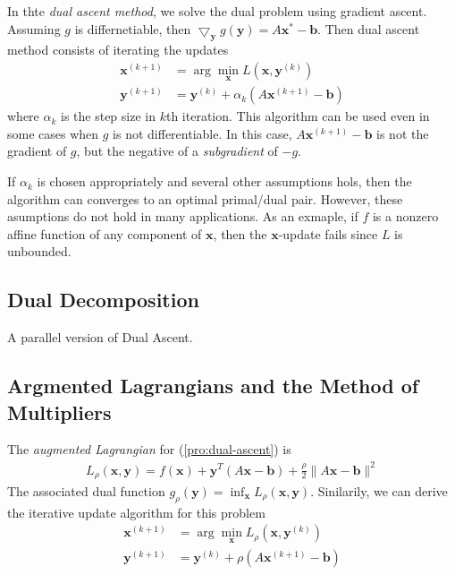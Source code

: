 In thte \emph{dual ascent method},
we solve the dual problem using gradient
ascent.
Assuming $g$ is differnetiable, then
$\bigtriangledown_\mathbf{y} g(\mathbf{y}) = A\mathbf{x}^* - \mathbf{b}$.
Then dual ascent method consists of iterating the updates
\begin{align}
    \mathbf{x}^{(k+1)} &= \arg\min_\mathbf{x}
    L(\mathbf{x}, \mathbf{y}^{(k)}) \\
    \mathbf{y}^{(k+1)} &= \mathbf{y}^{(k)} + 
    \alpha_k (A\mathbf{x}^{(k+1)} - \mathbf{b})
\end{align}
where $\alpha_k$ is the step size in $k$th iteration.
This algorithm can be used even in some cases when
$g$ is not differentiable. In this case, 
$A\mathbf{x}^{(k+1)} - \mathbf{b}$ is not the
gradient of $g$, but the negative of a 
\emph{subgradient} of $-g$.
\par
If $\alpha_k$ is chosen appropriately and several other
assumptions hols,
then the algorithm can converges to an optimal primal/dual
pair. However, these asumptions do not hold in many
applications. As an exmaple, if $f$ is a nonzero affine
function of any component of $\mathbf{x}$, then the
$\mathbf{x}$-update fails since $L$ is unbounded.

\subsection{Dual Decomposition}
A parallel version of Dual Ascent.

\subsection{Argmented Lagrangians and the Method of Multipliers}
The \emph{augmented Lagrangian} for (\ref{pro:dual-ascent}) is
\begin{align}
    L_\rho (\mathbf{x}, \mathbf{y}) = f(\mathbf{x}) + \mathbf{y}^T
    (A\mathbf{x} - \mathbf{b}) + \frac{\rho}{2} \parallel
    A\mathbf{x} - \mathbf{b} \parallel^2
\end{align}
The associated dual function 
$g_\rho(\mathbf{y}) = \inf_{\mathbf{x}} L_\rho (\mathbf{x}, \mathbf{y})$.
Sinilarily, we can derive the iterative update algorithm
for this problem
\begin{align}
    \mathbf{x}^{(k+1)} &= \arg\min_\mathbf{x}
    L_\rho(\mathbf{x}, \mathbf{y}^{(k)}) \\
    \mathbf{y}^{(k+1)} &= \mathbf{y}^{(k)} + 
    \rho (A\mathbf{x}^{(k+1)} - \mathbf{b})
\end{align}

